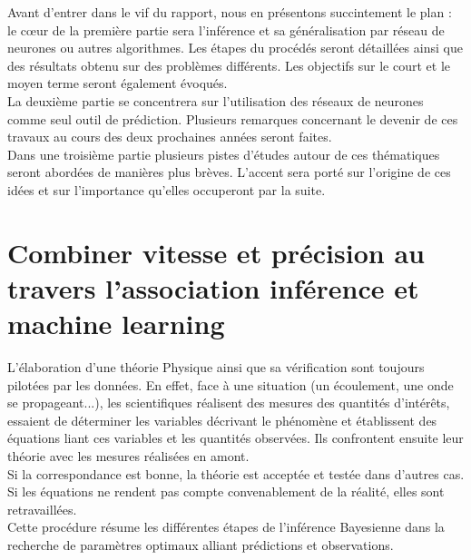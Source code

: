 \documentclass[a4paper,12pt]{article}
\newcommand\bk{\color{black}}
\newcommand\navy{\color{navy}}
\numberwithin{equation}{section} %
\begin{document}

\noindent Avant d'entrer dans le vif du rapport, nous en présentons succintement le plan : le cœur de la première partie sera l'inférence et sa généralisation par réseau de neurones ou autres algorithmes. Les étapes du procédés seront détaillées ainsi que des résultats obtenu sur des problèmes différents. Les objectifs sur le court et le moyen terme seront également évoqués.\\
La deuxième partie se concentrera sur l'utilisation des réseaux de neurones comme seul outil de prédiction. Plusieurs remarques concernant le devenir de ces travaux au cours des deux prochaines années seront faites.\\
Dans une troisième partie plusieurs pistes d'études autour de ces thématiques seront abordées de manières plus brèves. L'accent sera porté sur l'origine de ces idées et sur l'importance qu'elles occuperont par la suite.

\pagebreak

\navy \section{Combiner vitesse et précision au travers l'association inférence et machine learning}
 \bk
\noindent L'élaboration d'une théorie Physique ainsi que sa vérification sont toujours pilotées par les données. En effet, face à une situation (un écoulement, une onde se propageant...), les scientifiques réalisent des mesures des quantités d'intérêts, essaient de déterminer les variables décrivant le phénomène et établissent des équations liant ces variables et les quantités observées. Ils confrontent ensuite leur théorie avec les mesures réalisées en amont. \\
Si la correspondance est bonne, la théorie est acceptée et testée dans d'autres cas. Si les équations ne rendent pas compte convenablement de la réalité, elles sont retravaillées. \\
Cette procédure résume les différentes étapes de l'inférence Bayesienne dans la recherche de paramètres optimaux alliant prédictions et observations.
 
\end{document}
